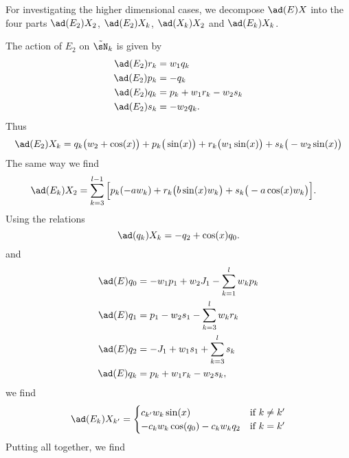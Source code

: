 For investigating the higher dimensional cases, we decompose $\ad(E)X$ into the four parts $\ad(E_2)X_2$, $\ad(E_2)X_k$, $\ad(X_k)X_2$ and $\ad(E_k)X_k$.

The action of $E_2$ on $\tilde\sN_k$ is given by
\begin{subequations}
	\begin{align}
		\ad(E_2)r_k & =w_1q_k            \\
		\ad(E_2)p_k & =-q_k              \\
		\ad(E_2)q_k & =p_k+w_1r_k-w_2s_k \\
		\ad(E_2)s_k & =-w_2q_k.
	\end{align}
\end{subequations}
Thus
\begin{equation}\label{LONGadEsurXki}
	\ad(E_2)X_k    =    q_k\big( w_2+\cos(x) \big)
	+ p_k\big( \sin(x) \big)
	+ r_k \big( w_1\sin(x) \big)
	+ s_k \big( -w_2\sin(x) \big)
\end{equation}
The same way we find
\begin{equation}
	\begin{aligned}[]
		\ad(E_k)X_2 = \sum_{k=3}^{l-1}\Big[ & p_k(-aw_k)
			+ r_k\big( b\sin(x)w_k\big)
			+ s_k\big( -a\cos(x)w_k \big)
			\Big].
	\end{aligned}
\end{equation}
Using the relations
\begin{equation}
	\ad(q_k)X_k=-q_2+\cos(x)q_0.
\end{equation}
and
\begin{subequations}
	\begin{align}
		\ad(E)q_0 & =-w_1p_1+w_2J_1-\sum_{k=1}^lw_kp_k \\
		\ad(E)q_1 & =p_1-w_2s_1-\sum_{k=3}^lw_kr_k     \\
		\ad(E)q_2 & =-J_1+w_1s_1+\sum_{k=3}^ls_k       \\
		\ad(E)q_k & =p_k+w_1r_k-w_2s_k,
	\end{align}
\end{subequations}
we find
\begin{equation}
	\ad(E_k)X_{k'}=\begin{cases}
		c_{k'}w_k\sin(x)           & \text{if }k\neq k' \\
		-c_kw_k\cos(q_0)-c_kw_kq_2 & \text{if }k=k'
	\end{cases}
\end{equation}
Putting all together, we find
